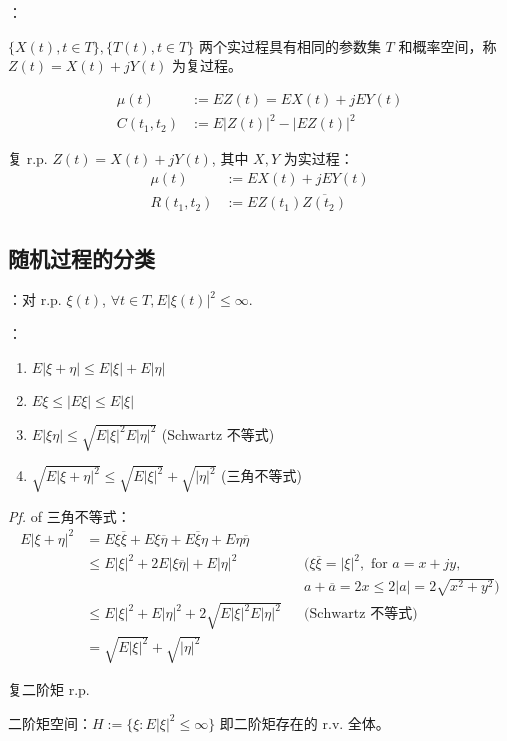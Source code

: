 ：

$\{X(t), t \in T\}, \{T(t), t \in T\}$ 两个实过程具有相同的参数集 $T$ 和概率空间，称 $Z(t) = X(t) + jY(t)$ 为复过程。

\begin{align*}
	\mu(t) &:= EZ(t) = EX(t) + jEY(t) \\
	C(t_1,t_2) &:= E|Z(t)|^2 - |EZ(t)|^2
\end{align*}

复 r.p. $Z(t) = X(t) +j Y(t)$, 其中 $X,Y$ 为实过程：
\begin{align*}
	\mu(t) &:= EX(t) + jEY(t) \\
	R(t_1,t_2) &:= EZ(t_1)\overline{Z(t_2)}
\end{align*}

\subsection{随机过程的分类}

：对 r.p. $\xi(t)$, $\forall t \in T, E|\xi(t)|^2 \le \infty$.

：
\begin{enumerate}
	\item $E|\xi + \eta| \le E|\xi| + E|\eta|$
	\item $E\xi \le |E\xi| \le E|\xi|$
	\item $E|\xi\eta| \le \sqrt{E|\xi|^2E|\eta|^2}$ (Schwartz 不等式)
	\item $\sqrt{E|\xi+\eta|^2} \le \sqrt{E|\xi|^2} + \sqrt{|\eta|^2}$ (三角不等式)
\end{enumerate}

\emph*{Pf.} of 三角不等式：
\begin{align*}
	E|\xi+\eta|^2 &= E\xi\overline{\xi} + E\xi\overline{\eta} + E\overline{\xi}\eta + E\eta\overline{\eta} \\
	&\le E|\xi|^2 + 2E|\xi\overline{\eta}|+E|\eta|^2 && (\xi\overline{\xi} = |\xi|^2,  \text{ for } a = x +jy,\\
	& &&a + \overline{a} = 2x \le 2|a| = 2\sqrt{x^2+y^2}) \\
	&\le E|\xi|^2 + E|\eta|^2 + 2\sqrt{E|\xi|^2E|\eta|^2} && \text{(Schwartz 不等式)}\\
	&= \sqrt{E|\xi|^2} + \sqrt{|\eta|^2}
\end{align*}

复二阶矩 r.p.

二阶矩空间：$H:=\{\xi:E|\xi|^2\le\infty\}$ 即二阶矩存在的 r.v. 全体。

